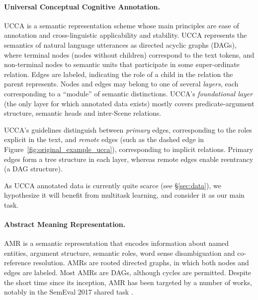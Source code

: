 \documentclass[11pt,a4paper]{article}
\begin{document}
\paragraph{Universal Conceptual Cognitive Annotation.}\label{sec:ucca}
UCCA \cite{abend2013universal} is a semantic representation scheme whose main principles
are ease of annotation and cross-linguistic applicability and stability.
UCCA represents the semantics of natural language utterances
as directed acyclic graphs (DAGs), where terminal nodes (nodes without children)
correspond to the text tokens, and non-terminal nodes to semantic units that participate
in some super-ordinate relation.
Edges are labeled, indicating the role of a child in the relation the parent represents.
Nodes and edges may belong to one of several \textit{layers}, each corresponding
to a ``module'' of semantic distinctions.
UCCA's \textit{foundational layer} (the only layer for which annotated data exists) 
mostly covers predicate-argument structure, semantic heads and inter-Scene relations.

UCCA's guidelines distinguish between \textit{primary} edges, corresponding 
to the roles explicit in the text, and \textit{remote} edges (such as the dashed edge in
Figure~\ref{fig:original_example_ucca}), corresponding to implicit relations.
Primary edges form a tree structure in each layer,
whereas remote edges enable reentrancy (a DAG structure).

As UCCA annotated data is currently quite scarce (see \S\ref{sec:data}), 
we hypothesize it will benefit from multitask learning, and consider it as our
main task.

\paragraph{Abstract Meaning Representation.}\label{sec:amr}

AMR \cite{banarescu2013abstract}
is a semantic representation that encodes information about named entities, 
argument structure, semantic roles, word sense disambiguation and co-reference resolution.
AMRs are rooted directed graphs, in which both nodes and edges are labeled.
Most AMRs are DAGs, although cycles are permitted.
Despite the short time since its inception, AMR has been targeted by a number of works,
notably in the SemEval 2017 shared task \cite{may2017semeval}.
\end{document}
